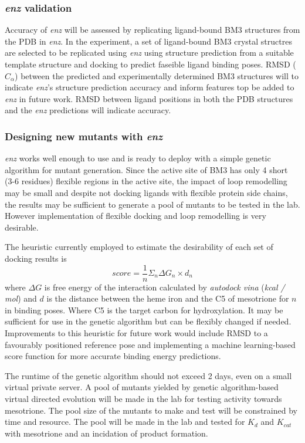 \documentclass{article}
\begin{document}
\subsubsection{\textit{enz} validation}
Accuracy of \textit{enz} will be assessed by replicating ligand-bound BM3 structures from the PDB in \textit{enz}.  %
In the experiment, a set of ligand-bound BM3 crystal structres are selected to be replicated using \textit{enz} using structure prediction from a suitable template structure and docking to predict faseible ligand binding poses. %
RMSD ($C_{\alpha}$) between the predicted and experimentally determined BM3 structures will to indicate \textit{enz}'s structure prediction accuracy and inform features top be added to \textit{enz} in future work.  %
RMSD between ligand positions in both the PDB structures and the \textit{enz} predictions will indicate accuracy. %
\par


\subsubsection{Designing new mutants with \textit{enz}}
\textit{enz} works well enough to use and is ready to deploy with a simple genetic algorithm for mutant generation. Since the active site of BM3 has only 4 short (3-6 residues)  flexible regions in the active site, the impact of loop remodelling may be small and despite not docking ligands with flexible protein side chains, the results may be sufficient to generate a pool of mutants to be tested in the lab. However implementation of flexible docking and loop remodelling is very desirable. %
\par
The heuristic currently employed to estimate the desirability of each set of docking results is %
\begin{equation}
score = \frac{1}{n}\Sigma _{n} \Delta G_{n} \times d_{n}
\end{equation}
where $ \Delta G $ is free energy of the interaction calculated by \textit{autodock vina} (\textit{kcal / mol}) and $ d $ is the distance between the heme iron and the C5 of mesotrione for $ n $ in binding poses. Where C5 is the target carbon for hydroxylation. It may be sufficient for use in the genetic algorithm but can be flexibly changed if needed. %
Improvements to this heuristic for future work would include RMSD to a favourably positioned reference pose and implementing a machine learning-based score function for more accurate binding energy predictions. %
\par
The runtime of the genetic algorithm should not exceed 2 days, even on a small virtual private server. A pool of mutants yielded by genetic algorithm-based virtual directed evolution will be made in the lab for testing activity towards mesotrione. %
The pool size of the mutants to make and test will be constrained by time and resource. The pool will be made in the lab and tested for $K_d$ and $K_{cat}$ with mesotrione and an incidation of product formation. %
\end{document}
